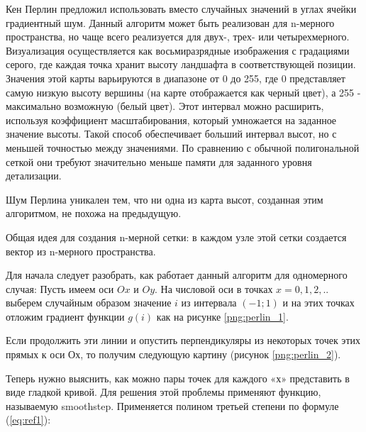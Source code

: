 Кен Перлин предложил использовать вместо случайных значений в углах ячейки градиентный шум. Данный алгоритм может быть реализован для n-мерного пространства, но чаще всего реализуется для двух-, трех- или четырехмерного. 
Визуализация осуществляется как восьмиразрядные изображения с градациями серого, где каждая точка хранит высоту ландшафта в соответствующей позиции. Значения этой карты варьируются в диапазоне от 0 до 255, где 0 представляет самую низкую высоту вершины (на карте отображается как черный цвет), а 255 - максимально возможную (белый цвет). Этот интервал можно расширить, используя коэффициент масштабирования, который умножается на заданное значение высоты. Такой способ обеспечивает больший интервал высот, но с меньшей точностью между значениями. По сравнению с обычной полигональной сеткой они требуют значительно меньше памяти для заданного уровня детализации.

Шум Перлина уникален тем, что ни одна из карта высот, созданная этим алгоритмом, не похожа на предыдущую.

Общая идея для создания n-мерной сетки: в каждом узле этой сетки создается вектор из n-мерного пространства.

Для начала следует разобрать, как работает данный алгоритм для одномерного случая:
Пусть имеем оси $Ox$ и $Oy$. На числовой оси в точках $x = {0, 1, 2,..}$ выберем случайным образом значение $i$ из интервала $(-1; 1)$ и на этих точках отложим градиент функции $g(i)$ как на рисунке \ref{png:perlin_1}.

\begin{figure}[H]
\end{figure}

Если продолжить эти линии и опустить перпендикуляры из некоторых точек этих прямых к оси Ох, то получим следующую картину (рисунок \ref{png:perlin_2}).
\begin{figure}[H]
\end{figure}

Теперь нужно выяснить, как можно пары точек для каждого «х» представить в виде гладкой кривой. Для решения этой проблемы применяют функцию, называемую smoothstep. Применяется полином третьей степени по формуле (\ref{eq:ref1}):

